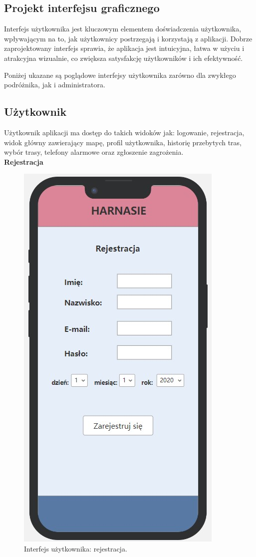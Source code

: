     \subsection{Projekt interfejsu graficznego}
    Interfejs użytkownika jest kluczowym elementem doświadczenia użytkownika, wpływającym na to, jak użytkownicy postrzegają i korzystają z aplikacji. Dobrze zaprojektowany interfejs sprawia, że aplikacja jest intuicyjna, łatwa w użyciu i atrakcyjna wizualnie, co zwiększa satysfakcję użytkowników i ich efektywność.

    Poniżej ukazane są poglądowe interfejsy użytkownika zarówno dla zwykłego podróżnika, jak i administratora.
    
    \subsection*{Użytkownik}
    Użytkownik aplikacji ma dostęp do takich widoków jak: logowanie, rejestracja, widok główny zawierający mapę, profil użytkownika, historię przebytych tras, wybór trasy, telefony alarmowe oraz zgłoszenie zagrożenia. \\
    \textbf{Rejestracja} 
     \begin{figure}[H]
        \centering
        \includegraphics[scale=0.5]{img/interfejsy/if_rejestracja.jpg}
        \caption{Interfejs użytkownika: rejestracja.}
        \label{interfejs:rejestracja}
    \end{figure}
